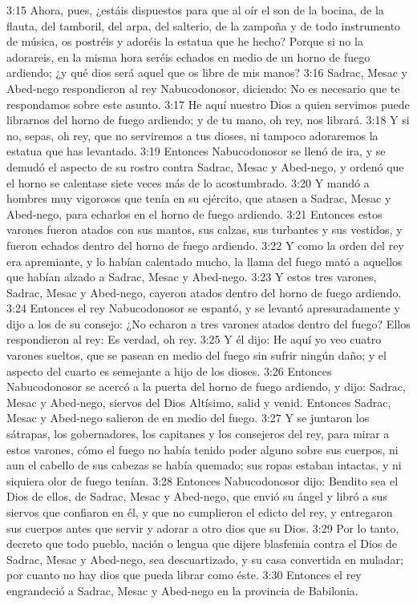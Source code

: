 3:15 Ahora, pues, ¿estáis dispuestos para que al oír el son de la bocina, de la flauta, del tamboril, del arpa, del salterio, de la zampoña y de todo instrumento de música, os postréis y adoréis la estatua que he hecho? Porque si no la adorareis, en la misma hora seréis echados en medio de un horno de fuego ardiendo; ¿y qué dios será aquel que os libre de mis manos?  
3:16 Sadrac, Mesac y Abed-nego respondieron al rey Nabucodonosor, diciendo: No es necesario que te respondamos sobre este asunto.  
3:17 He aquí nuestro Dios a quien servimos puede librarnos del horno de fuego ardiendo; y de tu mano, oh rey, nos librará.  
3:18 Y si no, sepas, oh rey, que no serviremos a tus dioses, ni tampoco adoraremos la estatua que has levantado.  
3:19 Entonces Nabucodonosor se llenó de ira, y se demudó el aspecto de su rostro contra Sadrac, Mesac y Abed-nego, y ordenó que el horno se calentase siete veces más de lo acostumbrado.  
3:20 Y mandó a hombres muy vigorosos que tenía en su ejército, que atasen a Sadrac, Mesac y Abed-nego, para echarlos en el horno de fuego ardiendo.  
3:21 Entonces estos varones fueron atados con sus mantos, sus calzas, sus turbantes y sus vestidos, y fueron echados dentro del horno de fuego ardiendo.  
3:22 Y como la orden del rey era apremiante, y lo habían calentado mucho, la llama del fuego mató a aquellos que habían alzado a Sadrac, Mesac y Abed-nego.  
3:23 Y estos tres varones, Sadrac, Mesac y Abed-nego, cayeron atados dentro del horno de fuego ardiendo.  
3:24 Entonces el rey Nabucodonosor se espantó, y se levantó apresuradamente y dijo a los de su consejo: ¿No echaron a tres varones atados dentro del fuego? Ellos respondieron al rey: Es verdad, oh rey.  
3:25 Y él dijo: He aquí yo veo cuatro varones sueltos, que se pasean en medio del fuego sin sufrir ningún daño; y el aspecto del cuarto es semejante a hijo de los dioses.  
3:26 Entonces Nabucodonosor se acercó a la puerta del horno de fuego ardiendo, y dijo: Sadrac, Mesac y Abed-nego, siervos del Dios Altísimo, salid y venid. Entonces Sadrac, Mesac y Abed-nego salieron de en medio del fuego.  
3:27 Y se juntaron los sátrapas, los gobernadores, los capitanes y los consejeros del rey, para mirar a estos varones, cómo el fuego no había tenido poder alguno sobre sus cuerpos, ni aun el cabello de sus cabezas se había quemado; sus ropas estaban intactas, y ni siquiera olor de fuego tenían.  
3:28 Entonces Nabucodonosor dijo: Bendito sea el Dios de ellos, de Sadrac, Mesac y Abed-nego, que envió su ángel y libró a sus siervos que confiaron en él, y que no cumplieron el edicto del rey, y entregaron sus cuerpos antes que servir y adorar a otro dios que su Dios.  
3:29 Por lo tanto, decreto que todo pueblo, nación o lengua que dijere blasfemia contra el Dios de Sadrac, Mesac y Abed-nego, sea descuartizado, y su casa convertida en muladar; por cuanto no hay dios que pueda librar como éste.  
3:30 Entonces el rey engrandeció a Sadrac, Mesac y Abed-nego en la provincia de Babilonia.  

